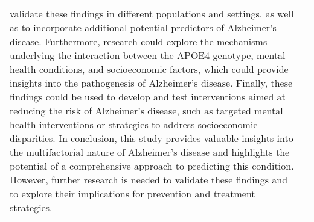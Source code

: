 \documentclass[conference]{IEEEtran}
\begin{document}
\begin{table}[htbp]
\begin{tabular}{|l|c|}
validate these findings in different populations and settings, as well as to incorporate additional potential predictors of Alzheimer's disease. Furthermore, research could explore the mechanisms underlying the interaction between the APOE4 genotype, mental health conditions, and socioeconomic factors, which could provide insights into the pathogenesis of Alzheimer's disease. Finally, these findings could be used to develop and test interventions aimed at reducing the risk of Alzheimer's disease, such as targeted mental health interventions or strategies to address socioeconomic disparities. In conclusion, this study provides valuable insights into the multifactorial nature of Alzheimer's disease and highlights the potential of a comprehensive approach to predicting this condition. However, further research is needed to validate these findings and to explore their implications for prevention and treatment strategies.


\end{tabular}
\end{table}
\end{document}
